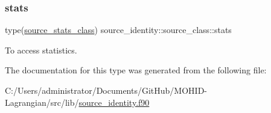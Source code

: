 \subsubsection{\texorpdfstring{stats}{stats}}
{\footnotesize\ttfamily type(\mbox{\hyperlink{structsource__identity_1_1source__stats__class}{source\+\_\+stats\+\_\+class}}) source\+\_\+identity\+::source\+\_\+class\+::stats\hspace{0.3cm}{\ttfamily [private]}}



To access statistics. 



The documentation for this type was generated from the following file\+:\begin{DoxyCompactItemize}
\item 
C\+:/\+Users/administrator/\+Documents/\+Git\+Hub/\+M\+O\+H\+I\+D-\/\+Lagrangian/src/lib/\mbox{\hyperlink{source__identity_8f90}{source\+\_\+identity.\+f90}}\end{DoxyCompactItemize}
